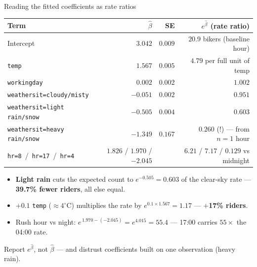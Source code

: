 \documentclass[aspectratio=169,11pt]{beamer}
\begin{document}
\begin{frame}{Reading the fitted coefficients as rate ratios}
  \footnotesize
  \begin{center}
  \begin{tabular}{@{}lrrr@{}}
    \toprule
    \textbf{Term} & $\hat\beta$ & SE & $e^{\hat\beta}$ (rate ratio) \\
    \midrule
    Intercept & $3.042$ & $0.009$ & $20.9$ bikers (baseline hour) \\
    \texttt{temp} & $1.567$ & $0.005$ & $4.79$ per full unit of temp \\
    \texttt{workingday} & $0.002$ & $0.002$ & $1.002$ \\
    \texttt{weathersit=cloudy/misty} & $-0.051$ & $0.002$ & $0.951$ \\
    \texttt{weathersit=light rain/snow} & $-0.505$ & $0.004$ & $0.603$ \\
    \texttt{weathersit=heavy rain/snow} & $-1.349$ & $0.167$ & $0.260$ \;(!) --- from $n=1$ hour \\
    \texttt{hr=8} \,/\, \texttt{hr=17} \,/\, \texttt{hr=4} & $1.826$ / $1.970$ / $-2.045$ & & $6.21$ / $7.17$ / $0.129$ vs midnight \\
    \bottomrule
  \end{tabular}
  \end{center}
  \begin{numexample}
    \begin{itemize}
      \item \textbf{Light rain} cuts the expected count to $e^{-0.505}=0.603$ of the
            clear-sky rate --- \textbf{39.7\% fewer riders}, all else equal.
      \item $+0.1$ \texttt{temp} ($\approx 4^{\circ}$C) multiplies the rate by
            $e^{0.1\times 1.567} = 1.17$ --- \textbf{$+$17\% riders}.
      \item Rush hour vs night: $e^{\,1.970-(-2.045)} = e^{4.015} = \mathbf{55.4}$ ---
            17:00 carries $55\times$ the 04:00 rate.
    \end{itemize}
  \end{numexample}
  \begin{takeaway}
    Report $e^{\hat\beta}$, not $\hat\beta$ --- and distrust coefficients built on one
    observation (heavy rain).
  \end{takeaway}
\end{frame}
\end{document}
